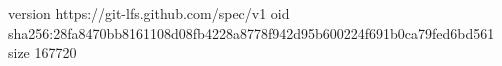 version https://git-lfs.github.com/spec/v1
oid sha256:28fa8470bb8161108d08fb4228a8778f942d95b600224f691b0ca79fed6bd561
size 167720
